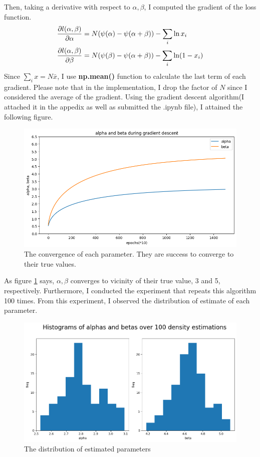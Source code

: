 \documentclass[10pt]{article}
\begin{document}
Then, taking a derivative with respect to $\alpha, \beta$, I computed the gradient of the loss function.
\begin{align}
    {\partial l(\alpha, \beta)\over \partial \alpha} &= N (\psi(\alpha) - \psi(\alpha + \beta)) - \sum_i \ln x_i \\
    {\partial l(\alpha, \beta)\over \partial \beta} &= N (\psi(\beta) - \psi(\alpha + \beta)) - \sum_i \ln (1-x_i)
\end{align}
Since $\sum_i x  = N\bar{x}$, I use \textbf{np.mean()} function to calculate the last term of each gradient. Please note that in the implementation, I drop the factor of $N$ since I considered the average of the gradient.
Using the gradient descent algorithm(I attached it in the appedix as well as submitted the .ipynb file), I attained the following figure. 
\clearpage
\begin{figure}[!h]
    \begin{center}
        \includegraphics[scale = 0.5]{"fig/fig1.png"}
    \end{center}
    \caption{The convergence of each parameter. They are success to converge to their true values.}
    \label{fig1}
\end{figure}
As figure \ref{fig1} says, $\alpha, \beta$ converges to vicinity of their true value, 3 and 5, respectively.
Furthermore, I conducted the experiment that repeats this algorithm 100 times. From this experiment, I observed the distribution of estimate of each parameter.

\begin{figure}[!h]
    \begin{center}
        \includegraphics[scale = 0.5]{"fig/fig2.png"}
    \end{center}
    \caption{The distribution of estimated parameters}
    \label{fig2}
\end{figure}
\end{document}
